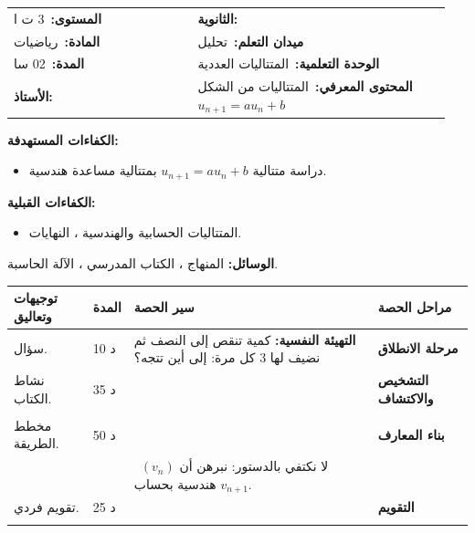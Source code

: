 \documentclass[12pt,a4paper]{article}
\makeatletter
\newenvironment{LTR}{\begin{otherlanguage}{english}}{\end{otherlanguage}}
\newcommand{\ar}[1]{\foreignlanguage{arabic}{#1}}
\newcommand{\Phase}[1]{\textbf{#1}}
\newcommand{\Fld}[2]{\textbf{#1:}\ #2}
\newcommand{\ModhHead}[9]{%
\begin{LTR}
\begin{tcolorbox}[enhanced,colback=white,colframe=cThm!85!black,arc=4mm,boxrule=1pt,top=14pt,bottom=6pt,left=8pt,right=8pt,
 overlay={\node[fill=cThm!85!black,text=white,rounded corners=3mm,inner xsep=14pt,inner ysep=4pt,font=\large\bfseries] at ([yshift=0pt]frame.north){\ar{مذكرة رقم #1}};},
 before upper={\selectlanguage{arabic}}]
\begin{tabular}{@{}p{0.4\linewidth}p{0.55\linewidth}@{}}
\Fld{المستوى}{#2} & \Fld{الثانوية}{\dotfill}\\[3pt]
\Fld{المادة}{رياضيات} & \Fld{ميدان التعلم}{#3}\\[3pt]
\Fld{المدة}{#5} & \Fld{الوحدة التعلمية}{#4}\\[3pt]
\Fld{الأستاذ}{\dotfill} & \Fld{المحتوى المعرفي}{#6}\\
\end{tabular}
\end{tcolorbox}
\begin{tcolorbox}[enhanced,colback=white,colframe=cThm!85!black,arc=3mm,boxrule=0.8pt,sidebyside,sidebyside align=top,lefthand ratio=0.5,
 segmentation style={dashed,cThm!60},before upper={\selectlanguage{arabic}},before lower={\selectlanguage{arabic}}]
\textbf{الكفاءات المستهدفة:}\par #8
\tcblower
\textbf{الكفاءات القبلية:}\par #7
\end{tcolorbox}
\end{LTR}
\par\smallskip\textbf{الوسائل:} #9\par\smallskip}
\newenvironment{Sayr}{%
\begin{LTR}\renewcommand{\arraystretch}{1.25}\setlength{\tabcolsep}{4pt}\relpenalty=10000\binoppenalty=10000\tolerance=9000\emergencystretch=0.3\linewidth
\begin{longtable}{|p{0.09\textwidth}|>{\centering\arraybackslash}p{0.05\textwidth}|p{0.71\textwidth}|>{\centering\arraybackslash}p{0.09\textwidth}|}
\hline\rowcolor{cThm!12}\ar{\footnotesize\textbf{توجيهات وتعاليق}} & \ar{\footnotesize\textbf{المدة}} & \ar{\textbf{سير الحصة}} & \ar{\footnotesize\textbf{مراحل الحصة}}\\\hline\endhead
\hline\endfoot}{\end{longtable}\end{LTR}}
\newcommand{\Row}[4]{\ar{\small #4} & \ar{#3} & \ar{#2} & \cellcolor{cThm!8}\ar{\Phase{#1}}\\\hline}
\newcommand{\Lab}[2]{\foreignlanguage{english}{\tcbox[on line,colback=#1,colframe=#1,boxrule=0pt,arc=2pt,boxsep=1pt,left=5pt,right=5pt,top=1pt,bottom=1pt]{\ar{\textcolor{white}{\textbf{#2}}}}}}
\newcommand{\RR}[1]{\ifmmode{\color{cThm}#1}\else$\mbox{\color{cThm}#1}$\fi}
\makeatother
\begin{document}
\newpage
\ModhHead{07}{3 ت ا}{تحليل}{المتتاليات العددية}{02 سا}{المتتاليات من الشكل $u_{n+1}=au_n+b$}%
{\begin{itemize}\item المتتاليات الحسابية والهندسية ، النهايات.\end{itemize}}%
{\begin{itemize}\item دراسة متتالية $u_{n+1}=au_n+b$ بمتتالية مساعدة هندسية.\end{itemize}}%
{المنهاج ، الكتاب المدرسي ، الآلة الحاسبة.}
\begin{Sayr}
\Row{مرحلة الانطلاق}{%
\textbf{التهيئة النفسية:} كمية تنقص إلى النصف ثم نضيف لها $3$ كل مرة: إلى أين تتجه؟}{10 د}{سؤال.}
\Row{التشخيص والاكتشاف}{%
\Lab{cEx}{مناقشة النشاط 04 صفحة 7}\ $u_0=1$ و $u_{n+1}=0{,}5u_n+3$.\par\textbf{(1)} احسب $u_1$ ، $u_2$ ، $u_3$.\par\textbf{(2)} حل المعادلة $l=0{,}5l+3$.\par\textbf{(3)} نضع $v_n=u_n-6$: بيّن أن $(v_n)$ هندسية ، ثم اكتب $u_n$ بدلالة $n$ واحسب $\lim u_n$.}{35 د}{نشاط الكتاب.}
\Row{}{%
\Lab{cDef}{مناقشة النشاط}\par\textbf{(1)} $u_1=0{,}5+3=\RR{3{,}5}$ ؛ $u_2=1{,}75+3=\RR{4{,}75}$ ؛ $u_3=2{,}375+3=\RR{5{,}375}$.\par\textbf{(2)} $l-0{,}5l=3$ ، أي $0{,}5l=3$: $\RR{l=6}$.\par\textbf{(3)} $v_{n+1}=u_{n+1}-6=0{,}5u_n+3-6=0{,}5u_n-3=0{,}5(u_n-6)=\RR{0{,}5\,v_n}$: هندسية أساسها $0{,}5$ وحدها الأول $v_0=1-6=-5$.\par $v_n=-5\times0{,}5^n$ ، إذن $\RR{u_n=6-5\times0{,}5^n}$ ؛ و $0{,}5^n\to0$ ومنه $\RR{\lim u_n=6}$.}{}{}
\Row{بناء المعارف}{%
\Lab{cMeth}{طريقة}\ لدراسة $u_{n+1}=au_n+b$ ($a\neq1$):\par\textbf{(1)} نحل $l=al+b$.\par\textbf{(2)} نضع $v_n=u_n-l$ ونبيّن أن $v_{n+1}=a\,v_n$ (هندسية أساسها $a$).\par\textbf{(3)} نكتب $v_n=v_0a^n$ ثم $\RR{u_n=l+v_0\,a^n}$ ، ونستنتج النهاية.}{50 د}{مخطط الطريقة.}
\Row{}{%
\Lab{cThm!80!black}{حذار}\ لا نكتفي بالدستور: نبرهن أن $(v_n)$ هندسية بحساب $v_{n+1}$.}{}{}
\Row{التقويم}{%
\Lab{cMeth}{تمرين تطبيقي}\par $(u_n)$ معرّفة بـ: $u_0=3$ و $u_{n+1}=3u_n-4$.\par\textbf{(1)} عيّن العدد $l$ بحيث $l=3l-4$.\par\textbf{(2)} نضع $v_n=u_n-2$: بيّن أن $(v_n)$ هندسية.\par\textbf{(3)} اكتب $u_n$ بدلالة $n$ ثم احسب $\lim u_n$.}{25 د}{تقويم فردي.}
\Row{}{%
\Lab{cEx}{حل التمرين التطبيقي}\par\textbf{(1)} $l=3l-4$ معناه $2l=4$: $\RR{l=2}$.\par\textbf{(2)} $v_{n+1}=u_{n+1}-2=3u_n-4-2=3u_n-6=3(u_n-2)=\RR{3v_n}$: هندسية أساسها $3$ وحدها الأول $v_0=3-2=1$.\par\textbf{(3)} $v_n=3^n$ ، إذن $\RR{u_n=2+3^n}$ ؛ و $3>1$ ومنه $3^n\to+\infty$: $\RR{\lim u_n=+\infty}$.\par\textbf{واجب منزلي:} تمارين 15 ، 16 ، 22 من باب المتتاليات.\par\smallskip\textbf{ملاحظات حول سير الحصة:} \dotfill}{}{}
\end{Sayr}
\end{document}
